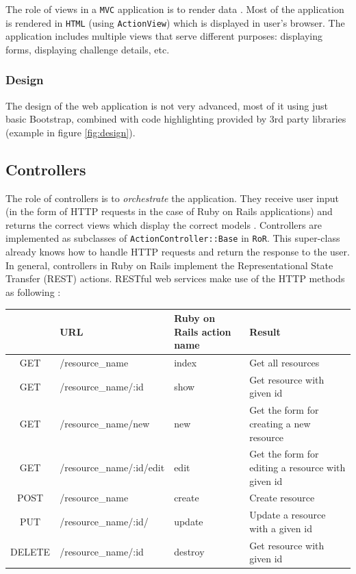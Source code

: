 The role of views in a \texttt{MVC} application is to render data \citep{ruby_on_rails}. Most of the application is rendered in \texttt{HTML} (using \texttt{ActionView}) which is displayed in user's browser. The application includes multiple views that serve different purposes: displaying forms, displaying challenge details, etc.

\subsubsection{Design}

The design of the web application is not very advanced, most of it using just basic Bootstrap, combined with code highlighting provided by 3rd party libraries (example in figure \ref{fig:design}).


\subsection{Controllers} \label{ch:design:web:controller}

The role of controllers is to \textit{orchestrate} the application. They receive user input (in the form of HTTP requests in the case of Ruby on Rails applications) and returns the correct views which display the correct models \citep{ruby_on_rails_book}. Controllers are implemented as subclasses of \texttt{ActionController::Base} in \texttt{RoR}. This super-class already knows how to handle HTTP requests and return the response to the user. In general, controllers in Ruby on Rails implement the Representational State Transfer (REST) actions. RESTful web services make use of the HTTP methods as following \citep{rodriguez2008restful}:

\begin{tabularx}{\textwidth}{|c|X|X|X|}
    \hline
    & \textbf{URL} & \textbf{Ruby on Rails action name} & \textbf{Result} \\\hline
    \endhead
    GET & /resource\_name & index & Get all resources \\\hline
    GET & /resource\_name/:id & show & Get resource with given id \\\hline
    GET & /resource\_name/new & new & Get the form for creating a new resource \\\hline
    GET & /resource\_name/:id/edit & edit & Get the form for editing a resource with given id \\\hline
    POST & /resource\_name & create & Create resource \\\hline
    PUT & /resource\_name/:id/ & update & Update a resource with a given id \\\hline
    DELETE & /resource\_name/:id & destroy & Get resource with given id \\\hline
\end{tabularx}

